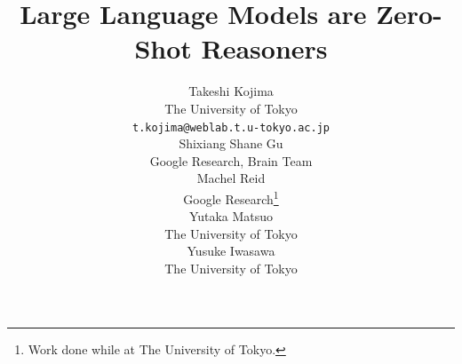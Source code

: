 \documentclass{article}
\title{Large Language Models are Zero-Shot Reasoners}
\author{%
  Takeshi Kojima%
  \\
  The University of Tokyo \\
  \texttt{t.kojima@weblab.t.u-tokyo.ac.jp} \\
  \And
  Shixiang Shane Gu
  \\
  Google Research, Brain Team \\
  \AND
  Machel Reid \\
  Google Research\thanks{Work done while at The University of Tokyo.} \\
  \And
  Yutaka Matsuo \\
  The University of Tokyo \\
  \And
  Yusuke Iwasawa \\
  The University of Tokyo \\
}
\newcommand{\sg}[1]{{\color{orange}[{#1} --SG]}}
\newcommand{\CoT}{chain of thought\xspace}
\begin{document}
\maketitle



\begin{abstract}
% 


\end{abstract}
\end{document}
